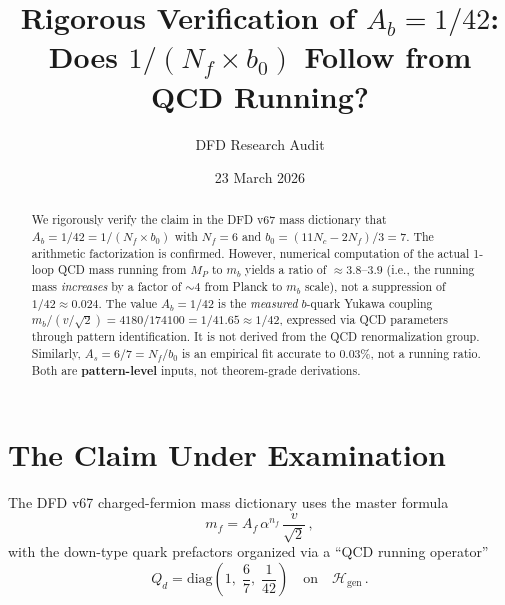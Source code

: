 \documentclass[11pt,a4paper]{article}
\newcommand{\Nf}{N_f}
\newcommand{\Nc}{N_c}
\theoremstyle{definition}
\theoremstyle{remark}
\begin{document}
\title{Rigorous Verification of $A_b = 1/42$:\\
Does $1/(\Nf \times b_0)$ Follow from QCD Running?}

\author{DFD Research Audit}

\date{23 March 2026}

\maketitle

\begin{abstract}
We rigorously verify the claim in the DFD v67 mass dictionary that
$A_b = 1/42 = 1/(\Nf \times b_0)$ with $\Nf = 6$ and
$b_0 = (11\Nc - 2\Nf)/3 = 7$.  The arithmetic factorization is confirmed.
However, numerical computation of the actual 1-loop QCD mass running from
$M_P$ to $m_b$ yields a ratio of $\approx 3.8$--$3.9$ (i.e., the running
mass \emph{increases} by a factor of $\sim 4$ from Planck to $m_b$ scale),
not a suppression of $1/42 \approx 0.024$.  The value $A_b = 1/42$ is the
\emph{measured} $b$-quark Yukawa coupling $m_b/(v/\sqrt{2}) = 4180/174100
= 1/41.65 \approx 1/42$, expressed via QCD parameters through pattern
identification.  It is not derived from the QCD renormalization group.
Similarly, $A_s = 6/7 = \Nf/b_0$ is an empirical fit accurate to $0.03\%$,
not a running ratio.  Both are \textbf{pattern-level} inputs, not
theorem-grade derivations.
\end{abstract}

\tableofcontents

\section{The Claim Under Examination}
\label{sec:claim}

The DFD v67 charged-fermion mass dictionary uses the master formula
\begin{equation}\label{eq:master}
m_f = A_f \,\alpha^{n_f}\, \frac{v}{\sqrt{2}}\,,
\end{equation}
with the down-type quark prefactors organized via a ``QCD running operator''
\begin{equation}\label{eq:Qd}
Q_d = \mathrm{diag}\!\left(1,\;\frac{6}{7},\;\frac{1}{42}\right)
\quad\text{on}\quad \mathcal{H}_{\mathrm{gen}}\,.
\end{equation}
\end{document}
